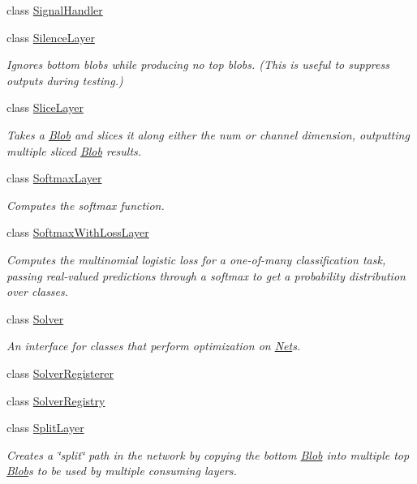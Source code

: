 \begin{DoxyCompactItemize}
class \hyperlink{classcaffe_1_1SignalHandler}{Signal\+Handler}
\item 
class \hyperlink{classcaffe_1_1SilenceLayer}{Silence\+Layer}
\begin{DoxyCompactList}\small\item\em Ignores bottom blobs while producing no top blobs. (This is useful to suppress outputs during testing.) \end{DoxyCompactList}\item 
class \hyperlink{classcaffe_1_1SliceLayer}{Slice\+Layer}
\begin{DoxyCompactList}\small\item\em Takes a \hyperlink{classcaffe_1_1Blob}{Blob} and slices it along either the num or channel dimension, outputting multiple sliced \hyperlink{classcaffe_1_1Blob}{Blob} results. \end{DoxyCompactList}\item 
class \hyperlink{classcaffe_1_1SoftmaxLayer}{Softmax\+Layer}
\begin{DoxyCompactList}\small\item\em Computes the softmax function. \end{DoxyCompactList}\item 
class \hyperlink{classcaffe_1_1SoftmaxWithLossLayer}{Softmax\+With\+Loss\+Layer}
\begin{DoxyCompactList}\small\item\em Computes the multinomial logistic loss for a one-\/of-\/many classification task, passing real-\/valued predictions through a softmax to get a probability distribution over classes. \end{DoxyCompactList}\item 
class \hyperlink{classcaffe_1_1Solver}{Solver}
\begin{DoxyCompactList}\small\item\em An interface for classes that perform optimization on \hyperlink{classcaffe_1_1Net}{Net}s. \end{DoxyCompactList}\item 
class \hyperlink{classcaffe_1_1SolverRegisterer}{Solver\+Registerer}
\item 
class \hyperlink{classcaffe_1_1SolverRegistry}{Solver\+Registry}
\item 
class \hyperlink{classcaffe_1_1SplitLayer}{Split\+Layer}
\begin{DoxyCompactList}\small\item\em Creates a \char`\"{}split\char`\"{} path in the network by copying the bottom \hyperlink{classcaffe_1_1Blob}{Blob} into multiple top \hyperlink{classcaffe_1_1Blob}{Blob}s to be used by multiple consuming layers. \end{DoxyCompactList}\item 

\end{DoxyCompactItemize}
